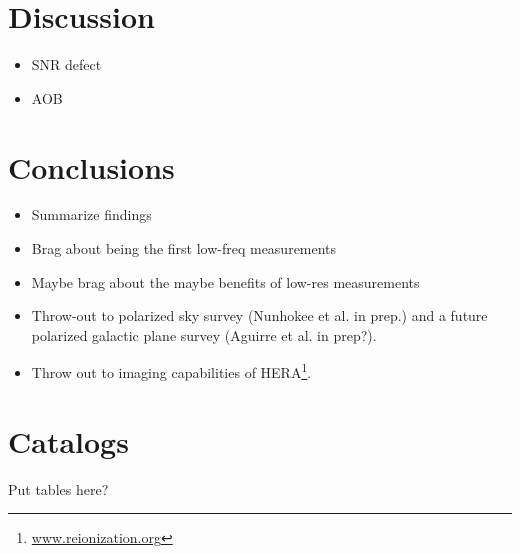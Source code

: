 \documentclass[useAMS,usenatbib]{mn2e}
\begin{document}
\section{Discussion}
\label{sec:disc}

\begin{itemize}
\item SNR defect
\item AOB
\end{itemize}

\section{Conclusions}
\label{sec:conc}

\begin{itemize}
\item Summarize findings
\item Brag about being the first low-freq measurements
\item Maybe brag about the maybe benefits of low-res measurements
\item Throw-out to polarized sky survey (Nunhokee et al. in prep.) and a future polarized galactic plane survey (Aguirre et al. in prep?).
\item Throw out to imaging capabilities of HERA\footnote{\url{www.reionization.org}}.
\end{itemize}

\appendix
\section{Catalogs}
Put tables here?

\clearpage

{}
\end{document}
